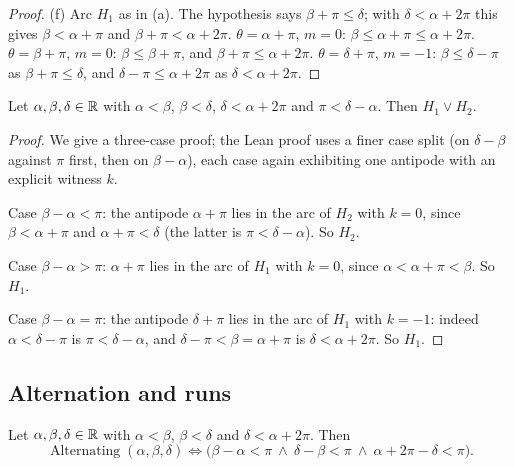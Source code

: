 \begin{proof}
(f) Arc $H_1$ as in (a). The hypothesis says $\beta+\pi\le\delta$; with $\delta<\alpha+2\pi$ this gives
$\beta<\alpha+\pi$ and $\beta+\pi<\alpha+2\pi$.
$\theta=\alpha+\pi$, $m=0$: $\beta\le\alpha+\pi\le\alpha+2\pi$.
$\theta=\beta+\pi$, $m=0$: $\beta\le\beta+\pi$, and $\beta+\pi\le\alpha+2\pi$.
$\theta=\delta+\pi$, $m=-1$: $\beta\le\delta-\pi$ as $\beta+\pi\le\delta$, and $\delta-\pi\le\alpha+2\pi$ as
$\delta<\alpha+2\pi$.
\end{proof}

\begin{lemma}\label{pc:lem:arc12}
Let $\alpha,\beta,\delta\in\mathbb R$ with $\alpha<\beta$, $\beta<\delta$, $\delta<\alpha+2\pi$ and $\pi<\delta-\alpha$.
Then $H_1\vee H_2$.
\end{lemma}

\begin{proof}
We give a three-case proof; the Lean proof uses a finer case split (on $\delta-\beta$ against $\pi$ first, then
on $\beta-\alpha$), each case again exhibiting one antipode with an explicit witness $k$.

Case $\beta-\alpha<\pi$: the antipode $\alpha+\pi$ lies in the arc of $H_2$ with $k=0$, since
$\beta<\alpha+\pi$ and $\alpha+\pi<\delta$ (the latter is $\pi<\delta-\alpha$). So $H_2$.

Case $\beta-\alpha>\pi$: $\alpha+\pi$ lies in the arc of $H_1$ with $k=0$, since $\alpha<\alpha+\pi<\beta$. So $H_1$.

Case $\beta-\alpha=\pi$: the antipode $\delta+\pi$ lies in the arc of $H_1$ with $k=-1$: indeed
$\alpha<\delta-\pi$ is $\pi<\delta-\alpha$, and $\delta-\pi<\beta=\alpha+\pi$ is $\delta<\alpha+2\pi$. So $H_1$.
\end{proof}

\subsection{Alternation and runs}

\begin{theorem}\label{pc:thm:alternating}
Let $\alpha,\beta,\delta\in\mathbb R$ with $\alpha<\beta$, $\beta<\delta$ and $\delta<\alpha+2\pi$. Then
\[
  \operatorname{Alternating}(\alpha,\beta,\delta)\iff
  \bigl(\beta-\alpha<\pi\ \wedge\ \delta-\beta<\pi\ \wedge\ \alpha+2\pi-\delta<\pi\bigr).
\]
\end{theorem}

